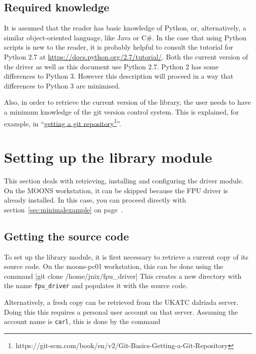 \documentclass{scrartcl}[12pt,a4paper]
\begin{document}
\subsection{Required knowledge}

It is assumed that the reader has basic knowledge of Python, or,
alternatively, a similar object-oriented language, like Java or C\#.
In the case that using Python scripts is new to the reader, it is
probably helpful to consult the tutorial for Python 2.7 at
\url{https://docs.python.org/2.7/tutorial/}.  Both the current version
of the driver as well as this document use Python 2.7. Python 2 has
some differences to Python 3. However this description will proceed in
a way that differences to Python 3 are minimised.

Also, in order to retrieve the current version of the library, the
user needs to have a minimum knowledge of the git version control
system. This is explained, for example, in
``\href{https://git-scm.com/book/en/v2/Git-Basics-Getting-a-Git-Repository}{getting
  a git repository}\footnote{https://git-scm.com/book/en/v2/Git-Basics-Getting-a-Git-Repository}''.

\section{Setting up the library module}

This section deals with retrieving, installing and configuring the
driver module. On the MOONS workstation, it can be skipped because the
FPU driver is already installed.  In this case, you can proceed
directly with section~\ref{sec:minimalexample} on
page~\pageref{sec:minimalexample}.

\subsection{Getting the source code}

To set up the library module, it is first
necessary to retrieve a current copy of its source code.
On the moons-pc01 workstation, this can be done using the
command |git clone /home/jnix/fpu_driver|
This creates a new directory with the name \texttt{fpu\_driver}
and populates it with the source code.

Alternatively, a fresh copy can be retrieved from the UKATC dalriada
server. Doing this this requires a personal user account on that
server. Assuming the account name is \texttt{carl}, this is done by
the command
\end{document}
